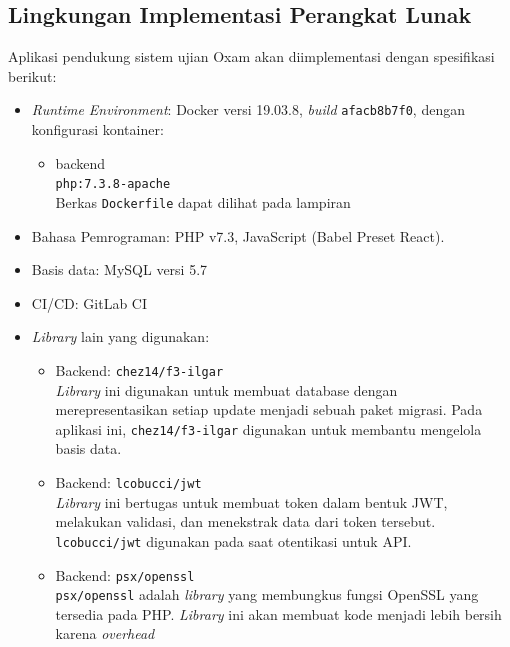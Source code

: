     \subsection{Lingkungan Implementasi Perangkat Lunak}
    Aplikasi pendukung sistem ujian Oxam akan diimplementasi dengan spesifikasi berikut:
    \begin{itemize}
        \item \textit{Runtime Environment}:
            Docker versi 19.03.8, \textit{build} \texttt{afacb8b7f0}, dengan konfigurasi kontainer:
            \begin{itemize}
                \item backend\\
                    \texttt{php:7.3.8-apache}\\
                    Berkas \texttt{Dockerfile} dapat dilihat pada lampiran %
            \end{itemize}
        \item Bahasa Pemrograman: PHP v7.3, JavaScript (Babel Preset React).
        \item Basis data: MySQL versi 5.7
        \item CI/CD: GitLab CI
        \item \textit{Library} lain yang digunakan:
            \begin{itemize}
                \item Backend: \texttt{chez14/f3-ilgar} \\
                    \textit{Library} ini digunakan untuk membuat database dengan merepresentasikan setiap update
                    menjadi sebuah paket migrasi. Pada aplikasi ini, \texttt{chez14/f3-ilgar} digunakan untuk
                    membantu mengelola basis data.
                \item Backend: \texttt{lcobucci/jwt} \\
                    \textit{Library} ini bertugas untuk membuat token dalam bentuk JWT, melakukan validasi, dan
                    menekstrak data dari token tersebut. \texttt{lcobucci/jwt} digunakan pada saat otentikasi
                    untuk API.
                \item Backend: \texttt{psx/openssl} \\
                    \texttt{psx/openssl} adalah \textit{library} yang membungkus fungsi OpenSSL yang tersedia
                    pada PHP. \textit{Library} ini akan membuat kode menjadi lebih bersih karena \textit{overhead}

\end{itemize}
\end{itemize}
